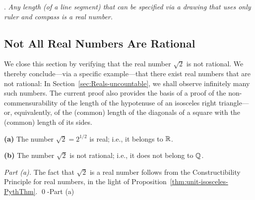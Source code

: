\medskip

.  {\em Any length (of a line segment) that can be specified via a drawing that uses only ruler and compass is a real number.}


\subsection{Not All Real Numbers Are Rational}
\label{sec:Real-vs-Rational}

We close this section by verifying that the real number $\sqrt{2}$ is not rational.  We thereby conclude---via a specific example---that there exist real numbers that are not rational: In
Section~\ref{sec:Reals-uncountable}, we shall observe infinitely many such numbers.  The current proof also provides the basis of a proof of the non-commensurability of the length of the hypotenuse of an isosceles right triangle---or, equivalently, of the (common) length of the diagonals of a square with the (common) length of its sides.
 

\begin{prop}
\label{thm:sqrt(2)}
{\bf (a)}
The number $\sqrt{2} = 2^{1/2}$ is real; i.e., it belongs to $\mathbb{R}$.

{\bf (b)}
The number $\sqrt{2}$ is not rational; i.e., it does not belong to $\mathbb{Q}$.
\end{prop}

\begin{proof}[Part (a)]
The fact that $\sqrt{2}$ is a real number follows from the Constructibility Principle for real numbers, in the light of Proposition~\ref{thm:unit-isosceles-PythThm}.  \qed-Part (a)
\end{proof}

\medskip

